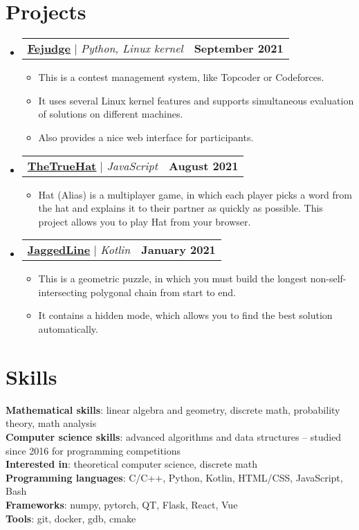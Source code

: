 \documentclass[letterpaper,11pt]{article}
\makeatletter
\newcommand{\resumeItem}[1]{
    \item\small{
        {#1 \vspace{-2pt}}
    }
}
\newcommand{\resumeProjectHeading}[2]{
    \item
    \begin{tabular*}{1.001\textwidth}{l@{\extracolsep{\fill}}r}
        \small#1 & \textbf{\small #2}\\
    \end{tabular*}\vspace{-7pt}
}
\newcommand{\resumeSubHeadingListStart}{\begin{itemize}[leftmargin=0.0in, label={}]}
\newcommand{\resumeSubHeadingListEnd}{\end{itemize}}
\newcommand{\resumeItemListStart}{\begin{itemize}}
\newcommand{\resumeItemListEnd}{\end{itemize}\vspace{-5pt}}
\makeatother
\begin{document}
\vspace{-16pt}
\section{Projects}
    \vspace{-5pt}
    \resumeSubHeadingListStart
    \resumeProjectHeading
        {\textbf{\href{https://github.com/m20-sch57/Fejudge}{\underline{Fejudge}}} $|$ \emph{Python, Linux kernel}}{September 2021}
        \resumeItemListStart
            \resumeItem{This is a contest management system, like Topcoder or Codeforces.}
            \resumeItem{It uses several Linux kernel features and supports simultaneous evaluation of solutions on different machines.}
            \resumeItem{Also provides a nice web interface for participants.}
        \resumeItemListEnd
        \vspace{-13pt}
    \resumeProjectHeading
        {\textbf{\href{https://github.com/m20-sch57/thetruehat}{\underline{TheTrueHat}}} $|$ \emph{JavaScript}}{August 2021}
        \resumeItemListStart
            \resumeItem{Hat (Alias) is a multiplayer game, in which each player picks a word from the hat and explains it to their partner as quickly as possible. This project allows you to play Hat from your browser.}
        \resumeItemListEnd
        \vspace{-13pt}
    \resumeProjectHeading
        {\textbf{\href{https://github.com/JaggedLine/KotlinLine}{\underline{JaggedLine}}} $|$ \emph{Kotlin}}{January 2021}
        \resumeItemListStart
            \resumeItem{This is a geometric puzzle, in which you must build the longest non-self-intersecting polygonal chain from start to end.}
            \resumeItem{It contains a hidden mode, which allows you to find the best solution automatically.}
        \resumeItemListEnd
    \resumeSubHeadingListEnd


\vspace{-16pt}
\section{Skills}
\begin{itemize}[leftmargin=0.15in, label={}]
    \small{\item{
        \textbf{Mathematical skills}{: linear algebra and geometry, discrete math, probability theory, math analysis} \\
        \textbf{Computer science skills}{: advanced algorithms and data structures -- studied since 2016 for programming competitions} \\
        \textbf{Interested in}{: theoretical computer science, discrete math} \\
        \textbf{Programming languages}{: C/C++, Python, Kotlin, HTML/CSS, JavaScript, Bash} \\
        \textbf{Frameworks}{: numpy, pytorch, QT, Flask, React, Vue} \\
        \textbf{Tools}{: git, docker, gdb, cmake} \\
    }}
\end{itemize}
\end{document}
